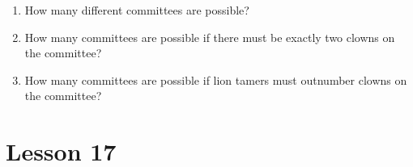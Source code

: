 \documentclass[11pt]{amsart}
\begin{document}
\begin{enumerate}
\begin{enumerate}
\item How many different committees are possible?\\[3pt]

\item How many committees are possible if there must be exactly two clowns
on the committee?\\[3pt]

\item How many committees are possible if lion tamers must outnumber clowns
on the committee?\\[5pt]

\end{enumerate}

\end{enumerate}

\section{Lesson 17}
\end{document}
